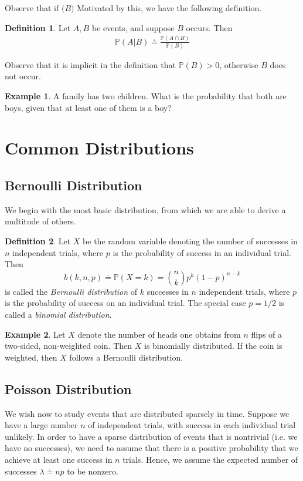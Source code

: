 \documentclass[12pt]{article}
\newcommand{\prob}{\mathbb{P}}
\theoremstyle{plain}
\theoremstyle{definition}
\newtheorem*{definition}{Definition}
\newtheorem*{example}{Example}
\theoremstyle{remark}
\numberwithin{equation}{section}  %
\begin{document}
Observe that if $\mathbb(B)$
Motivated by this, we have the following definition.
\begin{definition}
Let $A, B$ be events, and suppose $B$ occurs. Then
\begin{align*}
\prob(A | B) \doteq \frac{\prob(A \cap B)}{\prob(B)}
\end{align*}
\end{definition}
Observe that it is implicit in the definition that $\prob(B) > 0$, otherwise
$B$ does not occur.
\begin{example}
A family has two children. What is the probability that both are boys,
given that at least one of them is a boy?
\end{example}
\section{Common Distributions}
\subsection{Bernoulli Distribution}
We begin with the most basic distribution, from which
we are able to derive a multitude of others.
\begin{definition}
Let $X$ be the random variable denoting the number of successes
in $n$ independent trials, where $p$ is the probability of success in
an individual trial. Then
\begin{equation*}
b(k, n, p) \doteq \mathbb{P}(X = k) = \binom{n}{k} p^k (1 - p)^{n-k}
\end{equation*}
is called the \emph{Bernoulli distribution} of $k$ successes
in $n$ independent trials, where $p$ is the probability of success on an
individual trial. The special case
$p = 1/2$ is called a \emph{binomial distribution}.
\end{definition}
\begin{example}
Let $X$ denote the number of heads one obtains from $n$ flips of a
two-sided, non-weighted coin. Then $X$ is binomially distributed.
If the coin is weighted, then $X$ follows a Bernoulli distribution.
\end{example}
\subsection{Poisson Distribution}
We wish now to study events that are distributed sparsely in time.
Suppose we have a large number $n$ of independent trials, with
success in each individual trial unlikely. In order to have a sparse
distribution of events that is nontrivial (i.e. we have no successes),
we need to assume that there is a positive
probability that we achieve at least one success in $n$ trials. Hence, we assume the expected number of
successes $\lambda \doteq np$ to be nonzero.
\end{document}

